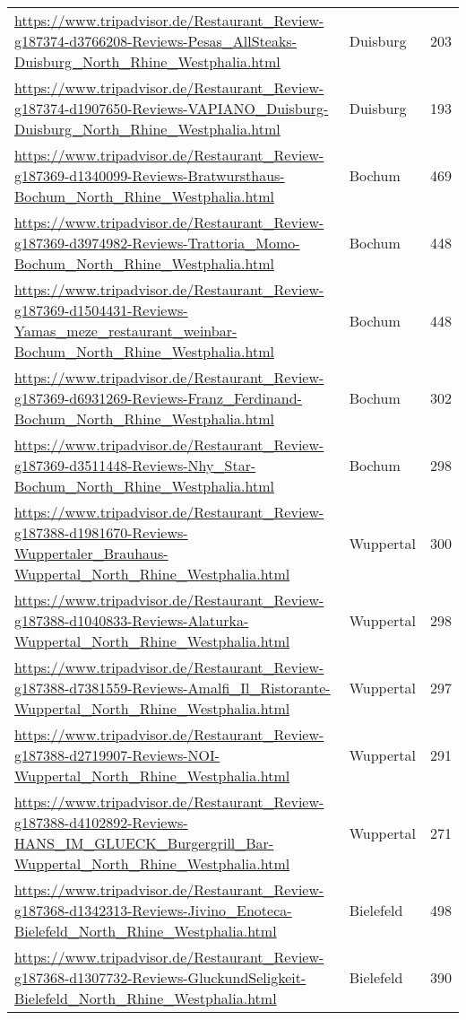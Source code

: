 \begin{table}[]
{\begin{tabular}{lll}
\url{https://www.tripadvisor.de/Restaurant\_Review-g187374-d3766208-Reviews-Pesas\_AllSteaks-Duisburg\_North\_Rhine\_Westphalia.html} & Duisburg & 203 \\ 
\url{https://www.tripadvisor.de/Restaurant\_Review-g187374-d1907650-Reviews-VAPIANO\_Duisburg-Duisburg\_North\_Rhine\_Westphalia.html} & Duisburg & 193 \\ 
\url{https://www.tripadvisor.de/Restaurant\_Review-g187369-d1340099-Reviews-Bratwursthaus-Bochum\_North\_Rhine\_Westphalia.html} & Bochum & 469 \\ 
\url{https://www.tripadvisor.de/Restaurant\_Review-g187369-d3974982-Reviews-Trattoria\_Momo-Bochum\_North\_Rhine\_Westphalia.html} & Bochum & 448 \\ 
\url{https://www.tripadvisor.de/Restaurant\_Review-g187369-d1504431-Reviews-Yamas\_meze\_restaurant\_weinbar-Bochum\_North\_Rhine\_Westphalia.html} & Bochum & 448 \\ 
\url{https://www.tripadvisor.de/Restaurant\_Review-g187369-d6931269-Reviews-Franz\_Ferdinand-Bochum\_North\_Rhine\_Westphalia.html} & Bochum & 302 \\ 
\url{https://www.tripadvisor.de/Restaurant\_Review-g187369-d3511448-Reviews-Nhy\_Star-Bochum\_North\_Rhine\_Westphalia.html} & Bochum & 298 \\ 
\url{https://www.tripadvisor.de/Restaurant\_Review-g187388-d1981670-Reviews-Wuppertaler\_Brauhaus-Wuppertal\_North\_Rhine\_Westphalia.html} & Wuppertal & 300 \\ 
\url{https://www.tripadvisor.de/Restaurant\_Review-g187388-d1040833-Reviews-Alaturka-Wuppertal\_North\_Rhine\_Westphalia.html} & Wuppertal & 298 \\ 
\url{https://www.tripadvisor.de/Restaurant\_Review-g187388-d7381559-Reviews-Amalfi\_Il\_Ristorante-Wuppertal\_North\_Rhine\_Westphalia.html} & Wuppertal & 297 \\ 
\url{https://www.tripadvisor.de/Restaurant\_Review-g187388-d2719907-Reviews-NOI-Wuppertal\_North\_Rhine\_Westphalia.html} & Wuppertal & 291 \\ 
\url{https://www.tripadvisor.de/Restaurant\_Review-g187388-d4102892-Reviews-HANS\_IM\_GLUECK\_Burgergrill\_Bar-Wuppertal\_North\_Rhine\_Westphalia.html} & Wuppertal & 271 \\ 
\url{https://www.tripadvisor.de/Restaurant\_Review-g187368-d1342313-Reviews-Jivino\_Enoteca-Bielefeld\_North\_Rhine\_Westphalia.html} & Bielefeld & 498 \\ 
\url{https://www.tripadvisor.de/Restaurant\_Review-g187368-d1307732-Reviews-GluckundSeligkeit-Bielefeld\_North\_Rhine\_Westphalia.html} & Bielefeld & 390 \\ 

\end{tabular}}
\end{table}
